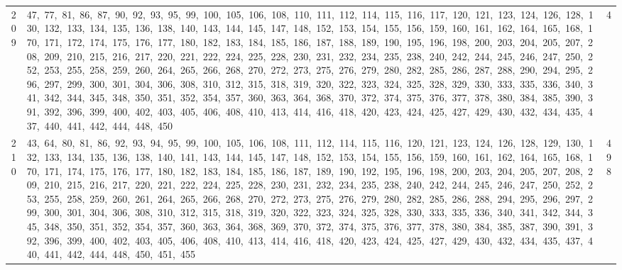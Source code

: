 \begin{longtable}{c|p{}|r}
209 & 47,\ 77,\ 81,\ 86,\ 87,\ 90,\ 92,\ 93,\ 95,\ 99,\ 100,\ 105,\ 106,\ 108,\ 110,\ 111,\ 112,\ 114,\ 115,\ 116,\ 117,\ 120,\ 121,\ 123,\ 124,\ 126,\ 128,\ 130,\ 132,\ 133,\ 134,\ 135,\ 136,\ 138,\ 140,\ 143,\ 144,\ 145,\ 147,\ 148,\ 152,\ 153,\ 154,\ 155,\ 156,\ 159,\ 160,\ 161,\ 162,\ 164,\ 165,\ 168,\ 170,\ 171,\ 172,\ 174,\ 175,\ 176,\ 177,\ 180,\ 182,\ 183,\ 184,\ 185,\ 186,\ 187,\ 188,\ 189,\ 190,\ 195,\ 196,\ 198,\ 200,\ 203,\ 204,\ 205,\ 207,\ 208,\ 209,\ 210,\ 215,\ 216,\ 217,\ 220,\ 221,\ 222,\ 224,\ 225,\ 228,\ 230,\ 231,\ 232,\ 234,\ 235,\ 238,\ 240,\ 242,\ 244,\ 245,\ 246,\ 247,\ 250,\ 252,\ 253,\ 255,\ 258,\ 259,\ 260,\ 264,\ 265,\ 266,\ 268,\ 270,\ 272,\ 273,\ 275,\ 276,\ 279,\ 280,\ 282,\ 285,\ 286,\ 287,\ 288,\ 290,\ 294,\ 295,\ 296,\ 297,\ 299,\ 300,\ 301,\ 304,\ 306,\ 308,\ 310,\ 312,\ 315,\ 318,\ 319,\ 320,\ 322,\ 323,\ 324,\ 325,\ 328,\ 329,\ 330,\ 333,\ 335,\ 336,\ 340,\ 341,\ 342,\ 344,\ 345,\ 348,\ 350,\ 351,\ 352,\ 354,\ 357,\ 360,\ 363,\ 364,\ 368,\ 370,\ 372,\ 374,\ 375,\ 376,\ 377,\ 378,\ 380,\ 384,\ 385,\ 390,\ 391,\ 392,\ 396,\ 399,\ 400,\ 402,\ 403,\ 405,\ 406,\ 408,\ 410,\ 413,\ 414,\ 416,\ 418,\ 420,\ 423,\ 424,\ 425,\ 427,\ 429,\ 430,\ 432,\ 434,\ 435,\ 437,\ 440,\ 441,\ 442,\ 444,\ 448,\ 450 & 4 \\
210 & 43,\ 64,\ 80,\ 81,\ 86,\ 92,\ 93,\ 94,\ 95,\ 99,\ 100,\ 105,\ 106,\ 108,\ 111,\ 112,\ 114,\ 115,\ 116,\ 120,\ 121,\ 123,\ 124,\ 126,\ 128,\ 129,\ 130,\ 132,\ 133,\ 134,\ 135,\ 136,\ 138,\ 140,\ 141,\ 143,\ 144,\ 145,\ 147,\ 148,\ 152,\ 153,\ 154,\ 155,\ 156,\ 159,\ 160,\ 161,\ 162,\ 164,\ 165,\ 168,\ 170,\ 171,\ 174,\ 175,\ 176,\ 177,\ 180,\ 182,\ 183,\ 184,\ 185,\ 186,\ 187,\ 189,\ 190,\ 192,\ 195,\ 196,\ 198,\ 200,\ 203,\ 204,\ 205,\ 207,\ 208,\ 209,\ 210,\ 215,\ 216,\ 217,\ 220,\ 221,\ 222,\ 224,\ 225,\ 228,\ 230,\ 231,\ 232,\ 234,\ 235,\ 238,\ 240,\ 242,\ 244,\ 245,\ 246,\ 247,\ 250,\ 252,\ 253,\ 255,\ 258,\ 259,\ 260,\ 261,\ 264,\ 265,\ 266,\ 268,\ 270,\ 272,\ 273,\ 275,\ 276,\ 279,\ 280,\ 282,\ 285,\ 286,\ 288,\ 294,\ 295,\ 296,\ 297,\ 299,\ 300,\ 301,\ 304,\ 306,\ 308,\ 310,\ 312,\ 315,\ 318,\ 319,\ 320,\ 322,\ 323,\ 324,\ 325,\ 328,\ 330,\ 333,\ 335,\ 336,\ 340,\ 341,\ 342,\ 344,\ 345,\ 348,\ 350,\ 351,\ 352,\ 354,\ 357,\ 360,\ 363,\ 364,\ 368,\ 369,\ 370,\ 372,\ 374,\ 375,\ 376,\ 377,\ 378,\ 380,\ 384,\ 385,\ 387,\ 390,\ 391,\ 392,\ 396,\ 399,\ 400,\ 402,\ 403,\ 405,\ 406,\ 408,\ 410,\ 413,\ 414,\ 416,\ 418,\ 420,\ 423,\ 424,\ 425,\ 427,\ 429,\ 430,\ 432,\ 434,\ 435,\ 437,\ 440,\ 441,\ 442,\ 444,\ 448,\ 450,\ 451,\ 455 & 498 \\

\end{longtable}
